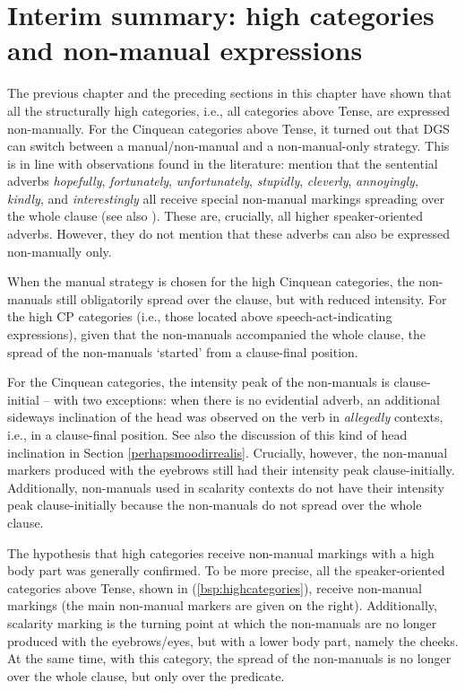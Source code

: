 \section{Interim summary: high categories and non-manual expressions}
\largerpage

The previous chapter and the preceding sections in this chapter have shown that all the structurally high categories, i.e., all categories above Tense, are expressed non-manually. For the Cinquean categories above Tense, it turned out that DGS can switch between a manual/non-manual and a non-manual-only strategy. This is in line with observations found in the literature: \citet[365--366]{happ2014vork} mention that the sentential adverbs \textit{hopefully}, \textit{fortunately}, \textit{unfortunately}, \textit{stupidly}, \textit{cleverly}, \textit{annoyingly}, \textit{kindly}, and \textit{interestingly} all receive special non-manual markings spreading over the whole clause (see also \citealt{herrmann2014nonmanual}). These are, crucially, all higher speaker-oriented adverbs. However, they do not mention that these adverbs can also be expressed non-manually only.

When the manual strategy is chosen for the high Cinquean categories, the non-manuals still obligatorily spread over the clause, but with reduced intensity. For the high CP categories (i.e., those located above speech-act-indicating expressions), given that the non-manuals accompanied the whole clause, the spread of the non-manuals `started' from a clause-final position.

For the Cinquean categories, the intensity peak of the non-manuals is clause-initial -- with two exceptions: when there is no evidential adverb, an additional sideways inclination of the head was observed on the verb in \textit{allegedly} contexts, i.e., in a clause-final position. See also the discussion of this kind of head inclination in Section \ref{perhapsmoodirrealis}. Crucially, however, the non-manual markers produced with the eyebrows still had their intensity peak clause-initially. Additionally, non-manuals used in scalarity contexts do not have their intensity peak clause-initially because the non-manuals do not spread over the whole clause.

The hypothesis that high categories receive non-manual markings with a high body part was generally confirmed. To be more precise, all the speaker-oriented categories above Tense, shown in (\ref{bsp:highcategories}), receive non-manual markings (the main non-manual markers are given on the right). Additionally, scalarity marking is the turning point at which the non-manuals are no longer produced with the eyebrows/eyes, but with a lower body part, namely the cheeks. At the same time, with this category, the spread of the non-manuals is no longer over the whole clause, but only over the predicate.

